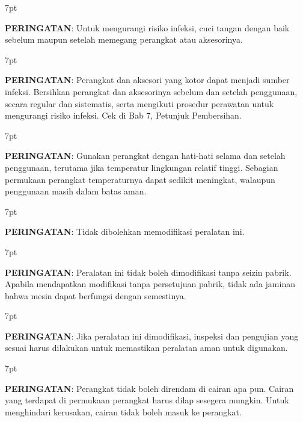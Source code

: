 \documentclass[11pt,a4paper,twoside,draft,onecolumn]{book}
\newenvironment{formalred}{%
	\def\FrameCommand{%
		\hspace{1pt}%
		{\color{red}\vrule width 2pt}%
		{\color{formalshade}\vrule width 4pt}%
		\colorbox{formalshade}%
	}%
	\MakeFramed{\advance\hsize-\width\FrameRestore}%
	\noindent\hspace{-4.55pt}%
	\begin{adjustwidth}{}{7pt}%
		\vspace{2pt}\vspace{2pt}%
	}
	{%
		\vspace{2pt}\end{adjustwidth}\endMakeFramed%
}
\begin{document}
				\begin{formalred}
					\raisebox{0.125ex}{\resizebox{!}{2ex}{\danger}} \textbf{PERINGATAN}: 
					Untuk mengurangi risiko infeksi, cuci tangan dengan baik sebelum maupun setelah memegang perangkat atau aksesorinya.
				\end{formalred}
			
				\begin{formalred}
					\raisebox{0.125ex}{\resizebox{!}{2ex}{\danger}} \textbf{PERINGATAN}: 
					Perangkat dan aksesori yang kotor dapat menjadi sumber infeksi. Bersihkan perangkat dan aksesorinya sebelum dan setelah penggunaan, secara regular dan sistematis, serta mengikuti prosedur perawatan untuk mengurangi risiko infeksi. Cek di Bab 7, Petunjuk Pembersihan.
				\end{formalred}
			
				\begin{formalred}
					\raisebox{0.125ex}{\resizebox{!}{2ex}{\danger}} \textbf{PERINGATAN}: 
					Gunakan perangkat dengan hati-hati selama dan setelah penggunaan, terutama jika temperatur lingkungan relatif tinggi. Sebagian permukaan perangkat temperaturnya dapat sedikit meningkat, walaupun penggunaan masih dalam batas aman.
				\end{formalred}
			
				\begin{formalred}
					\raisebox{0.125ex}{\resizebox{!}{2ex}{\danger}} \textbf{PERINGATAN}: 
					Tidak dibolehkan memodifikasi peralatan ini.
				\end{formalred}
			
				\begin{formalred}
					\raisebox{0.125ex}{\resizebox{!}{2ex}{\danger}} \textbf{PERINGATAN}: 
					Peralatan ini tidak boleh dimodifikasi tanpa seizin pabrik. Apabila mendapatkan modifikasi tanpa persetujuan pabrik, tidak ada jaminan bahwa mesin dapat berfungsi dengan semestinya.
				\end{formalred}
			
				\begin{formalred}
					\raisebox{0.125ex}{\resizebox{!}{2ex}{\danger}} \textbf{PERINGATAN}: 
					Jika peralatan ini dimodifikasi, inspeksi dan pengujian yang sesuai harus dilakukan untuk memastikan peralatan aman untuk digunakan.
				\end{formalred}
			
				\begin{formalred}
					\raisebox{0.125ex}{\resizebox{!}{2ex}{\danger}} \textbf{PERINGATAN}: 
					Perangkat tidak boleh direndam di cairan apa pun. Cairan yang terdapat di permukaan perangkat harus dilap sesegera mungkin. Untuk menghindari kerusakan, cairan tidak boleh masuk ke perangkat.
				\end{formalred}
			
\end{document}
